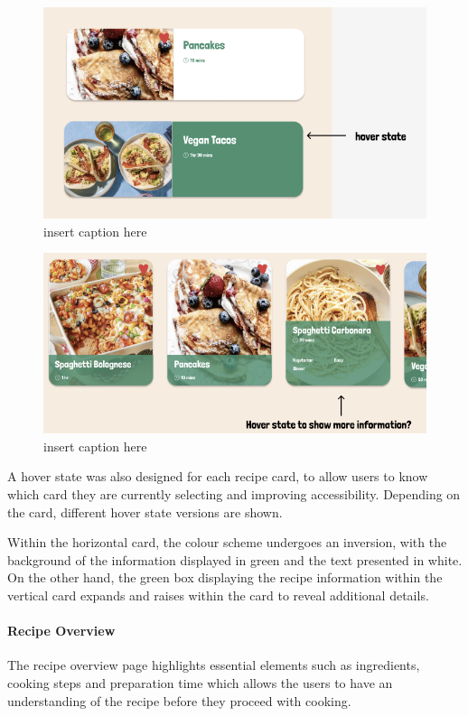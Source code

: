 \documentclass{article}
\begin{document}
\begin{figure}[h]
  \includegraphics[width=1.0\textwidth]{assets/Version 1 Horizontal Cards.png}
  \centering
  \caption{insert caption here}
\end{figure}

\begin{figure}[h]
  \includegraphics[width=1.0\textwidth]{assets/Version 1 Vertical Cards.png}
  \centering
  \caption{insert caption here}
\end{figure}

A hover state was also designed for each recipe card, to allow users to know which card they are currently selecting and improving accessibility. Depending on the card, different hover state versions are shown.

Within the horizontal card, the colour scheme undergoes an inversion, with the background of the information displayed in green and the text presented in white. On the other hand, the green box displaying the recipe information within the vertical card expands and raises within the card to reveal additional details.

\paragraph{Recipe Overview}
The recipe overview page highlights essential elements such as ingredients, cooking steps and preparation time which allows the users to have an understanding of the recipe before they proceed with cooking.
\end{document}
